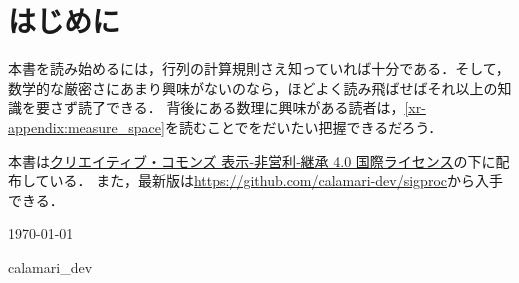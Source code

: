 \documentclass[../../main]{subfiles}
\begin{document}
\chapter{はじめに}
\thispagestyle{empty}

本書を読み始めるには，行列の計算規則さえ知っていれば十分である．そして，数学的な厳密さにあまり興味がないのなら，ほどよく読み飛ばせばそれ以上の知識を要さず読了できる．
背後にある数理に興味がある読者は，\cref{xr-appendix:measure_space}を読むことでをだいたい把握できるだろう．

本書は\href{https://creativecommons.org/licenses/by-nc-sa/4.0/deed.ja}{クリエイティブ・コモンズ 表示‐非営利‐継承 4.0 国際ライセンス}の下に配布している．
また，最新版は\url{https://github.com/calamari-dev/sigproc}から入手できる．

\vspace{1\zh}
\begin{flushleft}
  \noindent\hspace{2\zw}\today
\end{flushleft}
\begin{flushright}
  calamari\_dev\hspace*{2\zw}
\end{flushright}
\end{document}
